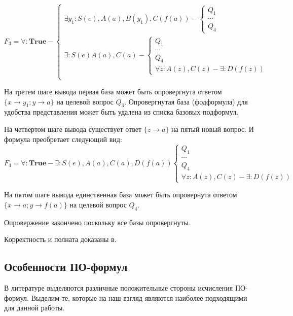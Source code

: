 \begin{example}
\begin{equation*}\label{ex:f3}
F_3 = 
\forall:\boldsymbol{True} - 
\left\lbrace
\begin{array}{l}
	\exists y_1\colon S(e),A(a),B(y_1),C(f(a)) -
	\left\lbrace
	\begin{array}{l}
		Q_1 \\ \cdots \\ Q_4
	\end{array}\right. \\
	\exists\colon S(e)A(a),C(a) -
	\left\lbrace
	\begin{array}{l}
		Q_1 \\ \cdots \\ Q_4 \\
		\forall z\colon A(z),C(z) - \exists\colon D(f(z))
	\end{array}\right. \\	 
\end{array}\right.
\end{equation*}

На третем шаге вывода первая база может быть опровергнута ответом $\{x \rightarrow y_1; y \rightarrow a\}$ на целевой вопрос $Q_3$. Опровергнутая база (фодформула) для удобства представления может быть удалена из списка базовых подформул. 

На четвертом шаге вывода существует ответ $\{z \rightarrow a\}$ на пятый новый вопрос. И формула преобретает следующий вид:
\begin{equation*}\label{ex:f5}
	F_4 = \forall\colon\boldsymbol{True} - \exists\colon S(e),A(a), C(a),D(f(a))
	\left\lbrace
	\begin{array}{l}
		Q_1 \\ \cdots \\ Q_4 \\
		\forall z\colon A(z),C(z) - \exists\colon D(f(z))
	\end{array}\right.
\end{equation*}

На пятом шаге вывода единственная база может быть опровернута ответом $\{x \rightarrow a; y \rightarrow f(a)\}$ на целевой вопрос $Q_4$. 

Опровержение закончено поскольку все базы опровергнуты.

\end{example}

Корректность и полната доказаны в.

\subsection{Особенности ПО-формул}
В литературе выделяются различные положительные стороны исчисления ПО-формул. Выделим те, которые на наш взгляд являются наиболее подходящими для данной работы.

